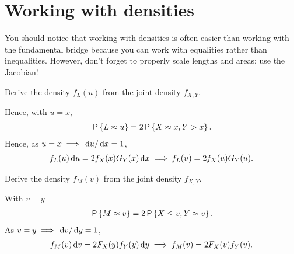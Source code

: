 \documentclass[a4paper,11pt]{article}
\begin{document}
\section{Working with densities}
\label{sec:work-with-dens}
You should notice that working with densities is often easier than working with the fundamental bridge because you can work with equalities rather than inequalities.
However, don't forget to properly scale lengths and areas; use the Jacobian!


\begin{exercise}
Derive the density $f_L(u)$ from the joint density $f_{X,Y}$.
\begin{solution}
Hence, with $u=x$,
\begin{align}
\P{L \approx u} = 2 \P{X \approx x, Y > x}.
\end{align}
Hence, as $u=x \implies \d u/\d x = 1$,
\begin{align*}
  f_{L}(u) \d u = 2f_{X}(x) G_{Y}(x) \d x \implies   f_{L}(u)  = 2f_{X}(u) G_{Y}(u).
\end{align*}
\end{solution}
\end{exercise}

\begin{exercise}\label{ex:6}
Derive the density $f_M(v)$ from the joint density $f_{X,Y}$.
\begin{solution}
With $v=y$
\begin{align}
\P{M \approx v} = 2 \P{X \leq v, Y \approx v}.
\end{align}
As $v=y \implies \d v/\d y = 1$,
\begin{align}
f_M(v) \d v =  2F_{X}(y) f_{Y}(y)\d y \implies f_M(v) =  2F_{X}(v) f_{Y}(v).
\end{align}
\end{solution}
\end{exercise}
\end{document}
